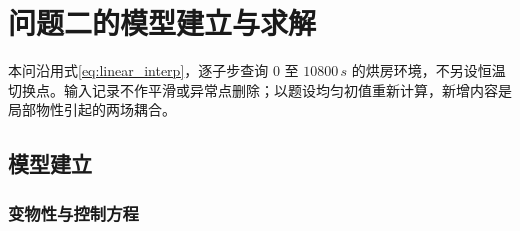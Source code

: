 \documentclass[withoutpreface,bwprint]{cumcmthesis}
\begin{document}
\section{问题二的模型建立与求解}

本问沿用式\eqref{eq:linear_interp}，逐子步查询 $0$ 至 $10800\,\si{s}$ 的烘房环境，不另设恒温切换点。输入记录不作平滑或异常点删除；以题设均匀初值重新计算，新增内容是局部物性引起的两场耦合。

\subsection{模型建立}

\subsubsection{变物性与控制方程}
\end{document}
